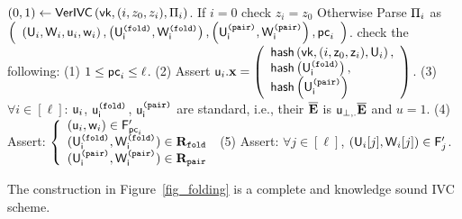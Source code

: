 \begin{small}
\begin{algorithm}[bt]
$ (0,1) \leftarrow \mathsf{VerIVC}\left(\mathsf{vk}, (i, z_0, z_i), {\Pi}_i\right)$. \newline
If $i=0$ check $z_i = z_0$ Otherwise Parse
${\Pi}_{i}$ as $\left(
	\begin{array}{l}
		\left(\mathsf{U}_{i}, \mathsf{W}_{i}, \mathsf{u}_{i}, \mathsf{w}_{i}\right), 
		\left(\mathsf{U^{\texttt{(fold)}}_{i}}, \mathsf{W^{\texttt{(fold)}}_{i}}\right), 
		\left(\mathsf{U^{\texttt{(pair)}}_{i}}, \mathsf{W^{\texttt{(pair)}}_{i}}\right),
		\mathsf{pc}_{i} 
	\end{array}
	\right)$. \newline
check the following: \newline
(1) $1 \leq \mathsf{pc}_i \leq \ell$. \newline
(2)  Assert $\mathsf{u}_i.{{\mathbf {x}}} = 
		\left(
		\begin{array}{l}
			\mathsf{hash}\left(\mathsf{vk}, (i, \mathsf{z}_0, \mathsf{z}_{i}), \mathsf{U}_{i}\right),  \\
			\mathsf{hash}\left(\mathsf{U^{\texttt{(fold)}}_{i}}\right),  \\
			\mathsf{hash}\left(\mathsf{U^{\texttt{(pair)}}_{i}}\right)
		\end{array}
	\right)$. \newline
(3) $\forall i\in [\ell]$:  $\mathsf{u}_{i}$, $\mathsf{u^{\texttt{(fold)}}_{i}}$, $\mathsf{u^{\texttt{(pair)}}_{i}}$ are standard, i.e.,
\newline
	their $\overline{{{\mathbf {E}}}}$ is $\mathsf{u_{\bot,{.}}}\overline{{{\mathbf {E}}}}$
	and $u = 1$. \newline
(4) Assert:
$\left\{\begin{array}{l}
	(\mathsf{u}_i, \mathsf{w}_i) \in \mathsf{F}_{\mathsf{pc}_i}' \\ 
	(\mathsf{U^{\texttt{(fold)}}_{i}}, \mathsf{W^{\texttt{(fold)}}_{i}}) \in \mathbf{R}_\texttt{fold} \\
	(\mathsf{U^{\texttt{(pair)}}_{i}}, \mathsf{W^{\texttt{(pair)}}_{i}}) \in \mathbf{R}_\texttt{pair}  \\
 \end{array}
\right.$ \newline
(5) Assert: $\forall j\in [\ell]$, $(\mathsf{U}_{i}[j], \mathsf{W}_{i}[j]) \in \mathsf{F}_{j}'$.  
\newline

\caption{Main IVC Framework}
\label{fig_folding}
\end{algorithm}
\end{small}

\begin{theorem} The construction in Figure\ \ref{fig_folding} is a complete and 
knowledge sound IVC scheme.
\end{theorem}

